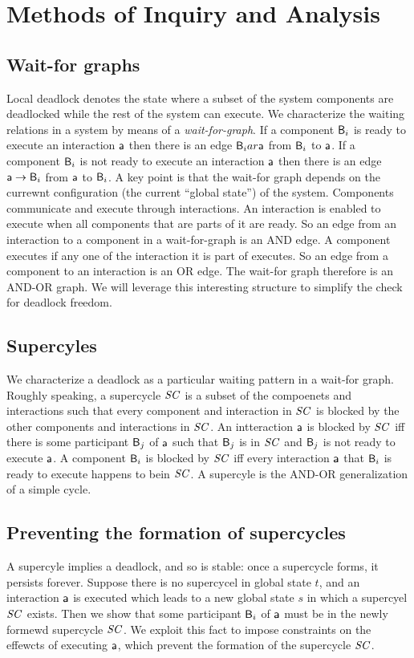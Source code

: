 \section{Methods of Inquiry and Analysis}

\subsection{Wait-for graphs}

Local deadlock denotes the state where a subset of the system components are deadlocked while the rest of the system can execute.
%
We characterize the waiting relations in a system by means of a {\em wait-for-graph}. 
If a component $\mathsf{B}_i$ is ready to execute an interaction $\mathsf{a}$ then there is an edge $\mathsf{B}_i ar \mathsf{a}$ from $\mathsf{B}_i$ to $\mathsf{a}$.
If a component $\mathsf{B}_i$ is not ready to execute an interaction $\mathsf{a}$ then there is an edge $\mathsf{a} \rightarrow \mathsf{B}_i$ from $\mathsf{a}$ to $\mathsf{B}_i$.
A key point is that the wait-for graph depends on the currewnt configuration (\ie the current ``global state'') of the system.
%
Components communicate and execute through interactions. 
An interaction is enabled to execute when all components that 
are parts of it are ready. 
So an edge from an interaction to a component in a wait-for-graph
is an AND edge. 
A component executes if any one of the interaction it is part of
executes. So an edge from a component to an interaction is an OR
edge. 
The wait-for graph therefore is an AND-OR graph. 
We will leverage this interesting structure to simplify the
check for deadlock freedom. 



\subsection{Supercyles}

We characterize a deadlock as a particular waiting pattern in a wait-for graph.
Roughly speaking, a supercycle $\mathit{SC}$ is a subset of the compoenets and interactions such that every component and interaction in $\mathit{SC}$ is blocked by
the other components and interactions in $\mathit{SC}$. 
An intteraction $\mathsf{a}$ is blocked by $\mathit{SC}$ iff there is some participant $\mathsf{B}_j$ of $\mathsf{a}$ such that $\mathsf{B}_j$ is in $\mathit{SC}$ and $\mathsf{B}_j$ is not ready to
execute $\mathsf{a}$.
A component $\mathsf{B}_i$ is blocked by $\mathit{SC}$ iff every interaction $\mathsf{a}$ that $\mathsf{B}_i$ is ready to execute happens to bein $\mathit{SC}$.
A supercyle is the AND-OR generalization of a simple cycle.



\subsection{Preventing the formation of supercycles}

A supercyle implies a deadlock, and so is stable: once a supercycle forms, it persists forever.
Suppose there is no supercycel in global state $t$, and an interaction $\mathsf{a}$ is executed which leads to a new global state $s$ in which a supercyel $\mathit{SC}$
exists. 
Then we show that some participant $\mathsf{B}_i$ of $\mathsf{a}$ must be in the newly formewd supercycle $\mathit{SC}$. 
We exploit this fact to impose constraints on the effewcts of executing $\mathsf{a}$, which prevent the formation of the supercycle $\mathit{SC}$.
